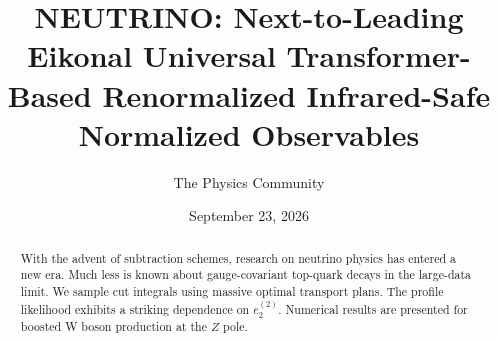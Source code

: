 \documentclass[11pt]{article}
\title{NEUTRINO: Next-to-Leading Eikonal Universal Transformer-Based Renormalized Infrared-Safe Normalized Observables}
\author{The Physics Community}
\date{September 23, 2026}
\numberwithin{equation}{section}
\theoremstyle{definition}
\theoremstyle{remark}
\begin{document}
\maketitle
\begin{abstract}
With the advent of subtraction schemes, research on neutrino physics has
entered a new era. Much less is known about gauge-covariant top-quark
decays in the large-data limit. We sample cut integrals using massive
optimal transport plans. The profile likelihood exhibits a striking
dependence on $e_2^{(2)}$. Numerical results are presented for boosted W
boson production at the $Z$ pole.
\end{abstract}
\tableofcontents





\nocite{*}


\end{document}

